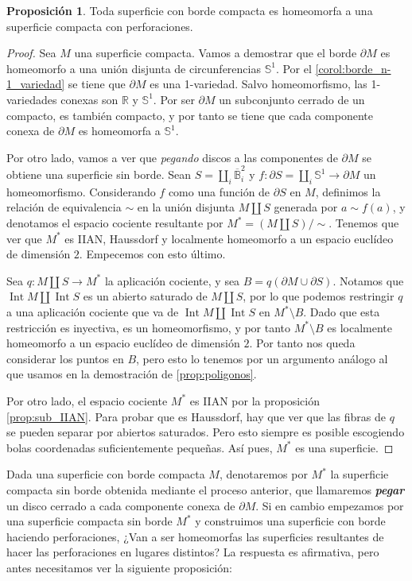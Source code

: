 \documentclass[10pt]{report}
\newcommand{\R}{\mathbb{R}}
\DeclareMathOperator{\interior}{Int} %
\newcommand{\enfatiza}[1]{\textbf{\textit{#1}}}
\theoremstyle{definition}
\newtheorem{prop}[defin]{Proposición}
\begin{document}
\begin{prop}\label{prop:borde_perforaciones}
Toda superficie con borde compacta es homeomorfa a una superficie compacta con perforaciones.
\end{prop}
\begin{proof}
Sea $M$ una superficie compacta. Vamos a demostrar que el borde $\partial M$ es homeomorfo a una unión disjunta de circunferencias $\mathbb{S}^1$. Por el \autoref{corol:borde_n-1_variedad} se tiene que $\partial M$ es una 1-variedad. Salvo homeomorfismo, las 1-variedades conexas son $\R$ y $\mathbb{S}^1$. Por ser $\partial M$ un subconjunto cerrado de un compacto, es también compacto, y por tanto se tiene que cada componente conexa de $\partial M$ es homeomorfa a $\mathbb{S}^1$.

Por otro lado, vamos a ver que \textit{pegando} discos a las componentes de $\partial M$ se obtiene una superficie sin borde. Sean $S=\amalg_i \overline{\mathbb{B}}_i^2$ y $f:\partial S=\amalg_i \mathbb{S}^1\to \partial M$ un homeomorfismo. Considerando $f$ como una función de $\partial S$ en $M$, definimos la relación de equivalencia $\sim$ en la unión disjunta $M\amalg S$ generada por $a\sim f(a)$, y denotamos el espacio cociente resultante por $M^*=(M\amalg S)/\sim$. Tenemos que ver que $M^*$ es IIAN, Haussdorf y localmente homeomorfo a un espacio euclídeo de dimensión $2$. Empecemos con esto último. 

Sea $q:M\amalg S\to M^*$ la aplicación cociente, y sea $B=q(\partial M\cup \partial S)$. Notamos que $\interior M\amalg \interior S$ es un abierto saturado de $M\amalg S$, por lo que podemos restringir $q$ a una aplicación cociente que va de $\interior M\amalg \interior S$ en $M^*\setminus B$. Dado que esta restricción es inyectiva, es un homeomorfismo, y por tanto $M^*\setminus B$ es localmente homeomorfo a un espacio euclídeo de dimensión $2$. Por tanto nos queda considerar los puntos en $B$, pero esto lo tenemos por un argumento análogo al que usamos en la demostración de \autoref{prop:poligonos}. 

Por otro lado, el espacio cociente $M^*$ es IIAN por la proposición \autoref{prop:sub_IIAN}. Para probar que es Haussdorf, hay que ver que las fibras de $q$ se pueden separar por abiertos saturados. Pero esto siempre es posible escogiendo bolas coordenadas suficientemente pequeñas. Así pues, $M^*$ es una superficie. 
\end{proof}

Dada una superficie con borde compacta $M$, denotaremos por $M^*$ la superficie compacta sin borde obtenida mediante el proceso anterior, que llamaremos \enfatiza{pegar} un disco cerrado a cada componente conexa de $\partial M$. Si en cambio empezamos por una superficie compacta sin borde $M^*$ y construimos una superficie con borde haciendo perforaciones, ¿Van a ser homeomorfas las superficies resultantes de hacer las perforaciones en lugares distintos? La respuesta es afirmativa, pero antes necesitamos ver la siguiente proposición:
\end{document}
